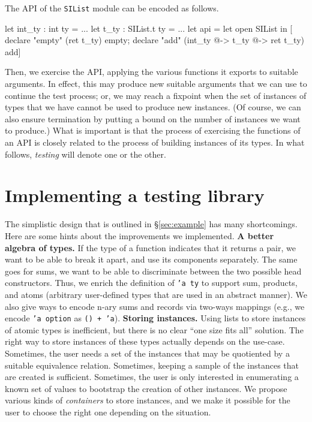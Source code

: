 \documentclass[twocolumn,9pt,a4paper]{easychair}
\newcommand{\code}[1]{\texttt{#1}}
\newcommand{\sref}[1]{\S\ref{#1}}
\renewcommand\paragraph[1]{\newline\textbf{#1}}
\begin{document}
The API of the \code{SIList} module can be encoded as follows.
\begin{ocamlcode}
let int_ty : int ty = ...
let t_ty : SIList.t ty = ...
let api =
  let open SIList in
  [ declare "empty" (ret t_ty) empty;
    declare "add"
    (int_ty @-> t_ty @-> ret t_ty) add]
\end{ocamlcode}
Then, we exercise the API, applying the various functions it exports
to suitable arguments. In effect, this may produce new suitable
arguments that we can use to continue the test process; or, we may
reach a fixpoint when the set of instances of types that we have
cannot be used to produce new instances. (Of course, we can also
ensure termination by putting a bound on the number of instances we
want to produce.)  What is important is that the process of exercising
the functions of an API is closely related to the process of building
instances of its types. In what follows, \emph{testing} will denote
one or the other.

\section{Implementing a testing library}
The simplistic design that is outlined in \sref{sec:example} has many
shortcomings. Here are some hints about the improvements we
implemented.
%
\paragraph{A better algebra of types.} If the type of a function
indicates that it returns a pair, we want to be able to break it
apart, and use its components separately. The same goes for sums, we
want to be able to discriminate between the two possible head
constructors. Thus, we enrich the definition of \code{'a ty} to
support sum, products, and atoms (arbitrary user-defined types that
are used in an abstract manner). We also give ways to encode n-ary
sums and records via two-ways mappings (e.g., we encode \code{'a
  option} as \code{() + 'a}).
%
\paragraph{Storing instances.} Using lists to store instances of
atomic types is inefficient, but there is no clear ``one size fits
all'' solution. The right way to store instances of these types
actually depends on the use-case.
%
Sometimes, the user needs a set of the instances that may be
quotiented by a suitable equivalence relation.
%
Sometimes, keeping a sample of the instances that are created is
sufficient.
%
Sometimes, the user is only interested in enumerating a known set of
values to bootstrap the creation of other instances.
%
We propose various kinds of \emph{containers} to store instances, and
we make it possible for the user to choose the right one depending on
the situation.
%
\end{document}
